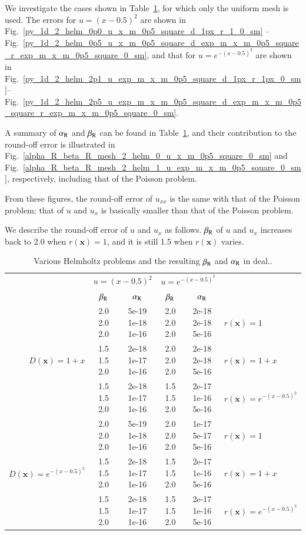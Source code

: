 \documentclass[review,3p]{elsarticle}
\begin{document}
We investigate the cases shown in Table~\ref{results_various_helmholtz_problems_for_beta_r_decrease_1d_dealii}, for which only the uniform mesh is used.
The errors for $u=(x-0.5)^2$ are shown in Fig.~\ref{py_1d_2_helm_0p0_u_x_m_0p5_square_d_1px_r_1_0_sm} -- Fig.~\ref{py_1d_2_helm_0p5_u_x_m_0p5_square_d_exp_m_x_m_0p5_square_r_exp_m_x_m_0p5_square_0_sm}, and that for $u=e^{-(x-0.5)^2}$ are shown in Fig.~\ref{py_1d_2_helm_2p1_u_exp_m_x_m_0p5_square_d_1px_r_1px_0_sm}--Fig.~\ref{py_1d_2_helm_2p5_u_exp_m_x_m_0p5_square_d_exp_m_x_m_0p5_square_r_exp_m_x_m_0p5_square_0_sm}.


A summary of $\alpha_{\rm R}$ and $\beta_{\rm R}$ can be found in Table~\ref{results_various_helmholtz_problems_for_beta_r_decrease_1d_dealii}, and their contribution to the round-off error is illustrated in Fig.~\ref{alpha_R_beta_R_mesh_2_helm_0_u_x_m_0p5_square_0_sm} and Fig.~\ref{alpha_R_beta_R_mesh_2_helm_1_u_exp_m_x_m_0p5_square_0_sm}, respectively, including that of the Poisson problem.

From these figures, the round-off error of $u_{xx}$ is the same with that of the Poisson problem; that of $u$ and $u_x$ is basically smaller than that of the Poisson problem.

We describe the round-off error of $u$ and $u_x$ as follows.
$\beta_{\rm R}$ of $u$ and $u_x$ increases back to 2.0 when $r(\mathbf{x})=1$, and it is still 1.5 when $r(\mathbf{x})$ varies.

\begin{table}[!ht]
\caption{Various Helmholtz problems and the resulting $\beta_{\rm R}$ and $\alpha_{\rm R}$ in deal..}
\centering
\scriptsize
\begin{tabular}{r|c|c|c|c|l}
 \multirow{2}{*}{} & \multicolumn{2}{c|}{$u=(x-0.5)^2$} & \multicolumn{2}{c|}{$u=e^{-(x-0.5)^2}$} & \\ \cline{2-5}
 & $\beta_{\rm R}$ & $\alpha_{\rm R}$ & $\beta_{\rm R}$ & $\alpha_{\rm R}$ \\ \hline
 \multirow{3}{*}{$D(\mathbf{x}) = 1+x$} & 2.0 2.0 2.0 & 5e-19 1e-18 1e-16 & 2.0 2.0 2.0 & 2e-18 2e-18 5e-16  & $r(\mathbf{x})=1$ \\ \cline{2-6}
   & 1.5 1.5 2.0 & 2e-18 1e-17 1e-16 & 2.0 2.0 2.0 & 2e-18 2e-18 5e-16 & $r(\mathbf{x})=1+x$ \\ \cline{2-6} 
   & 1.5 1.5 2.0 & 2e-18 1e-17 1e-16 & 1.5 1.5 2.0 & 2e-17 1e-16 5e-16 & $r(\mathbf{x})=e^{-(x-0.5)^2}$  \\ \hline  
 \multirow{3}{*}{$D(\mathbf{x}) = e^{-(x-0.5)^2}$} & 2.0 2.0 2.0 & 5e-19 1e-18 1e-16 & 2.0 2.0 2.0 & 1e-17 5e-17 5e-16 & $r(\mathbf{x})=1$ \\ \cline{2-6}
 & 1.5 1.5 2.0 & 2e-18 1e-17 1e-16 & 1.5 1.5 2.0 & 2e-17 1e-16 5e-16 & $r(\mathbf{x})=1+x$ \\ \cline{2-6}
 & 1.5 1.5 2.0 & 2e-18 1e-17 1e-16 & 1.5 1.5 2.0 & 2e-17 1e-16 5e-16 & $r(\mathbf{x})=e^{-(x-0.5)^2}$ \\ 
\end{tabular}
\label{results_various_helmholtz_problems_for_beta_r_decrease_1d_dealii}
\end{table}
\end{document}
